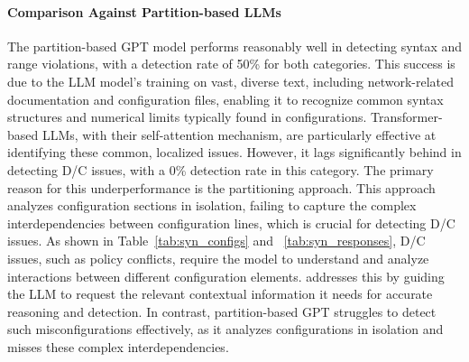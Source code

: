 
\paragraph{Comparison Against Partition-based LLMs} The partition-based GPT model performs reasonably well in detecting syntax and range violations, with a detection rate of 50\% for both categories.
This success is due to the LLM model's training on vast, diverse text, including network-related documentation and configuration files, enabling it to recognize common syntax structures and numerical limits typically found in configurations. Transformer-based LLMs, with their self-attention mechanism, are particularly effective at identifying these common, localized issues.
However, it lags significantly behind \sysname{} in detecting D/C issues, with a 0\% detection rate in this category. The primary reason for this underperformance is the partitioning approach. This approach analyzes configuration sections in isolation, failing to capture the complex interdependencies between configuration lines, which is crucial for detecting D/C issues. 
As shown in Table~\ref{tab:syn_configs} and ~\ref{tab:syn_responses}, D/C issues, such as policy conflicts, require the model to understand and analyze interactions between different configuration elements. \sysname{} addresses this by guiding the LLM to request the relevant contextual information it needs for accurate reasoning and detection. In contrast, partition-based GPT struggles to detect such misconfigurations effectively, as it analyzes configurations in isolation and misses these complex interdependencies.

